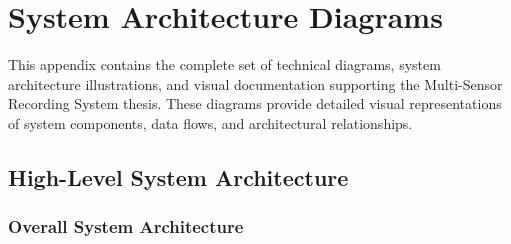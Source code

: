 \section{System Architecture Diagrams}

This appendix contains the complete set of technical diagrams, system architecture illustrations, and visual documentation supporting the Multi-Sensor Recording System thesis. These diagrams provide detailed visual representations of system components, data flows, and architectural relationships.

\subsection{High-Level System Architecture}

\subsubsection{Overall System Architecture}

